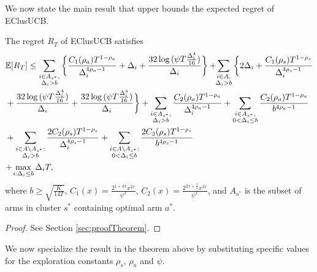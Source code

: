 	
We now state the main result that upper bounds the expected regret of EClusUCB.
\begin{theorem}
\label{Result:Theorem:1}
The regret $R_T$ of EClusUCB satisfies
\begin{align*}
&\mathbb{E} [R_{T}]\leq 
\sum\limits_{\substack{i\in A_{s^{*}},\\\Delta_{i} > b}}\bigg\lbrace \frac{C_1(\rho_{a})T^{1-\rho_{a}}}{\Delta_{i}^{4\rho_{a}-1}} + \Delta_{i}
+ \frac{32\log{(\psi T\frac{\Delta_{i}^{4}}{16})}}{\Delta_{i}} \bigg\rbrace
 + \! \! \sum\limits_{\substack{i\in A,\\\Delta_{i} > b}} \bigg\lbrace 2\Delta_{i}+
\frac{C_1(\rho_{s})T^{1-\rho_{s}}}{\Delta_{i}^{4\rho_{s}-1}} \\
&+ \frac{32\log{(\psi T\frac{\Delta_{i}^{4}}{16})}}{\Delta_{i}} 
+ \frac{32\log{(\psi T\frac{\Delta_{i}^{4}}{16})}}{\Delta_{i}}\bigg\rbrace 
+ \sum\limits_{\substack{i\in A_{s^{*}},\\ \Delta_{i} > b}} 
\frac{C_2(\rho_{a})T^{1-\rho_{a}}}{\Delta_{i}^{4\rho_{a}-1}}
+\sum\limits_{\substack{i\in A_{s^{*}},\\0 < \Delta_{i}\leq b}}\frac{C_2(\rho_a)T^{1-\rho_{a}}}{b^{4\rho_{a} -1}}\\ 
&+ \sum_{\substack{i\in A\setminus A_{s^*}:\\\Delta_{i}> b}}\frac{2C_{2}(\rho_{s})T^{1-\rho_{s}}}{\Delta_{i}^{4\rho_{s}-1}} +\sum_{\substack{i\in A \setminus A_{s^*}:\\ 0 < \Delta_{i} \leq b}}\frac{2C_{2}(\rho_{s})T^{1-\rho_{s}}}{b^{4\rho_{s}-1}}\\
& \!+\! \max\limits_{i:\Delta_{i}\leq b}\Delta_{i}T, 
\end{align*}
where $b\geq \sqrt{\frac{K}{14 T}}$, $C_1(x) = \frac{2^{1+4x}x^{2x}}{\psi^{x}}$, $C_2(x) = \frac{2^{2x+\frac{3}{2}}x^{2x}}{\psi^{x}}$, and $A_{s^{*}}$ is the subset of arms in cluster $s^{*}$ containing optimal arm $a^{*}$.
\end{theorem}
\begin{proof}
 See Section \ref{sec:proofTheorem}.
\end{proof}
We now specialize the result in the theorem above by substituting specific values for the exploration constants $\rho_{s}$, $\rho_{a}$ and $\psi$. 


